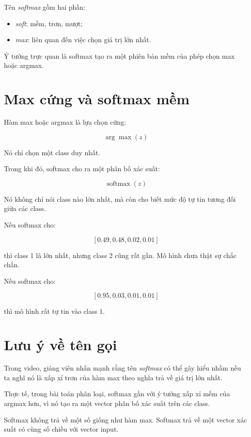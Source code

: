 \documentclass[12pt,a4paper]{report}
\begin{document}
Tên \textit{softmax} gồm hai phần:

\begin{itemize}
    \item \textit{soft}: mềm, trơn, mượt;
    \item \textit{max}: liên quan đến việc chọn giá trị lớn nhất.
\end{itemize}

Ý tưởng trực quan là softmax tạo ra một phiên bản mềm của phép chọn max hoặc argmax.

\section{Max cứng và softmax mềm}

Hàm max hoặc argmax là lựa chọn cứng:

\[
    \arg\max(z)
\]

Nó chỉ chọn một class duy nhất.

Trong khi đó, softmax cho ra một phân bố xác suất:

\[
    \operatorname{softmax}(z)
\]

Nó không chỉ nói class nào lớn nhất, mà còn cho biết mức độ tự tin tương đối giữa các class.

\begin{vidu}
Nếu softmax cho:

\[
    [0.49, 0.48, 0.02, 0.01]
\]

thì class 1 là lớn nhất, nhưng class 2 cũng rất gần. Mô hình chưa thật sự chắc chắn.

Nếu softmax cho:

\[
    [0.95, 0.03, 0.01, 0.01]
\]

thì mô hình rất tự tin vào class 1.
\end{vidu}

\section{Lưu ý về tên gọi}

Trong video, giảng viên nhấn mạnh rằng tên \textit{softmax} có thể gây hiểu nhầm nếu ta nghĩ nó là xấp xỉ trơn của hàm max theo nghĩa trả về giá trị lớn nhất.

Thực tế, trong bài toán phân loại, softmax gần với ý tưởng xấp xỉ mềm của argmax hơn, vì nó tạo ra một vector phân bố xác suất trên các class.

\begin{luuy}
Softmax không trả về một số giống như hàm max. Softmax trả về một vector xác suất có cùng số chiều với vector input.
\end{luuy}
\end{document}
